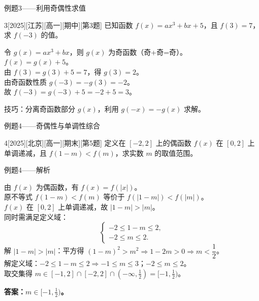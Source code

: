 \begin{frame}{例题3——利用奇偶性求值}
	\begin{example}{3}[2025][江苏][高一][期中][第3题]
		已知函数 $f(x)=ax^3+bx+5$，且 $f(3)=7$，求 $f(-3)$ 的值。
	\end{example}
	\pause
	\begin{solutions}
		令 $g(x)=ax^3+bx$，则 $g(x)$ 为奇函数（奇+奇=奇）。\\
		$f(x)=g(x)+5$。\\
		由 $f(3)=g(3)+5=7$，得 $g(3)=2$。\\
		由奇函数性质 $g(-3)=-g(3)=-2$。\\
		故 $f(-3)=g(-3)+5=-2+5=3$。
	\end{solutions}
	\pause
	\begin{tip}
		技巧：分离奇函数部分 $g(x)$，利用 $g(-x)=-g(x)$ 求解。
	\end{tip}
\end{frame}

\begin{frame}{例题4——奇偶性与单调性综合}
	\begin{example}{4}[2025][北京][高一][期末][第5题]
		定义在 $[-2,2]$ 上的偶函数 $f(x)$ 在 $[0,2]$ 上单调递减，且 $f(1-m)<f(m)$，求实数 $m$ 的取值范围。
	\end{example}
\end{frame}

\begin{frame}[allowframebreaks]{例题4——解析}
	\begin{solutions}
		由 $f(x)$ 为偶函数，有 $f(x)=f(|x|)$。\\
		原不等式 $f(1-m)<f(m)$ 等价于 $f(|1-m|)<f(|m|)$。\\[3mm]
		$f(x)$ 在 $[0,2]$ 上单调递减，故 $|1-m|>|m|$。\\[3mm]
		同时需满足定义域：
		\[
		\begin{cases}
			-2\le 1-m\le 2,\\
			-2\le m\le 2.
		\end{cases}
		\]
		解 $|1-m|>|m|$：平方得 $(1-m)^2>m^2\Rightarrow 1-2m>0\Rightarrow m<\dfrac12$。\\
		解定义域：$-2\le 1-m\le 2\Rightarrow -1\le m\le 3$；$-2\le m\le 2$。\\
		取交集得 $m\in[-1,2]\cap[-2,2]\cap\left(-\infty,\frac12\right)=[-1,\frac12)$。
	\end{solutions}
	\vspace{2mm}
	\color{ProofRed}\textbf{答案：$m\in[-1,\frac12)$。}
\end{frame}

